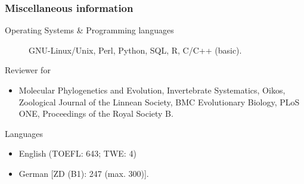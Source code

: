 \documentclass[letter,10pt]{article}
\begin{document}
\subsubsection*{Miscellaneous information}
\begin{small}
	\begin{description}
		\item[Operating Systems \& Programming languages] GNU-Linux/Unix, Perl, Python, SQL, R, C/C++ (basic).
		\item[Reviewer for]
	\end{description}

	\begin{itemize}
		\item Molecular Phylogenetics and Evolution, Invertebrate Systematics, Oikos, Zoological Journal of the Linnean Society, BMC Evolutionary Biology, PLoS ONE, Proceedings of the Royal Society B.
	\end{itemize}

	\begin{description}
		\item[Languages]
	\end{description}

	\begin{itemize}
		\item English (TOEFL: 643; TWE: 4)
		\item German [ZD (B1): 247 (max. 300)].
	\end{itemize}



\end{small}
\end{document}
